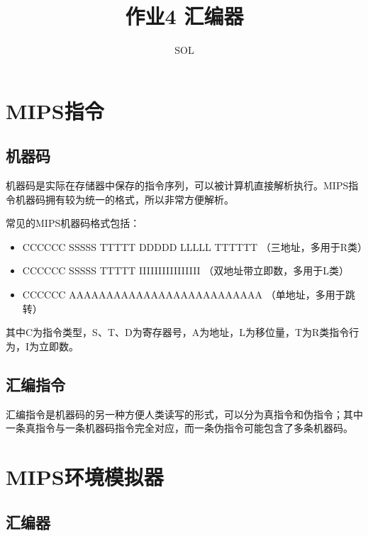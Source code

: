 \documentclass{ctexart}
\author{SOL}
\title{作业4 汇编器}
\begin{document}
\setcounter{page}{1}
\maketitle
\newpage

\setcounter{page}{1}

\section {MIPS指令}

    \subsection {机器码}
    
        \par 机器码是实际在存储器中保存的指令序列，可以被计算机直接解析执行。MIPS指令机器码拥有较为统一的格式，所以非常方便解析。
        \par 常见的MIPS机器码格式包括：
        
        \begin{itemize}
            \item CCCCCC SSSSS TTTTT DDDDD LLLLL TTTTTT （三地址，多用于R类）
            \item CCCCCC SSSSS TTTTT IIIIIIIIIIIIIIII （双地址带立即数，多用于L类）
            \item CCCCCC AAAAAAAAAAAAAAAAAAAAAAAAAA （单地址，多用于跳转）
        \end{itemize}
        \par 其中C为指令类型，S、T、D为寄存器号，A为地址，L为移位量，T为R类指令行为，I为立即数。

    \subsection {汇编指令}
        
        \par 汇编指令是机器码的另一种方便人类读写的形式，可以分为真指令和伪指令；其中一条真指令与一条机器码指令完全对应，而一条伪指令可能包含了多条机器码。
        

\section {MIPS环境模拟器}
            
    \subsection {汇编器}
\end{document}
